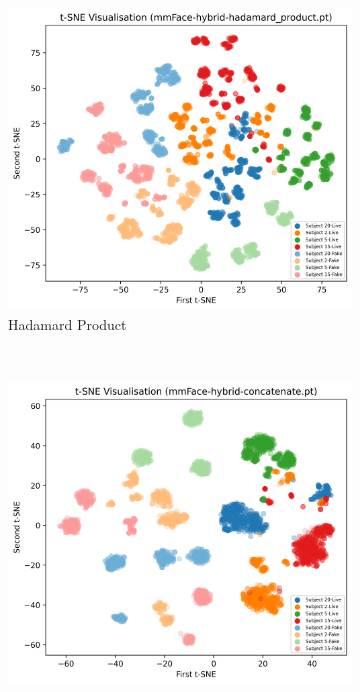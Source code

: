 \documentclass{mpaper}
\begin{document}
\begin{figure}[!t] 
    \centering
    \begin{subfigure}[b]{0.32\textwidth}
        \includegraphics[width=1.06\textwidth]{figures/tsne_hadamard_product.png}
        \caption{Hadamard Product}
        \label{fig:tsne_hadamard_product}
    \end{subfigure}
    ~\hspace{0.01cm}
    \begin{subfigure}[b]{0.32\textwidth}
        \includegraphics[width=1.06\textwidth]{figures/tsne_concatenate.png}

\end{subfigure}
\end{figure}
\end{document}
